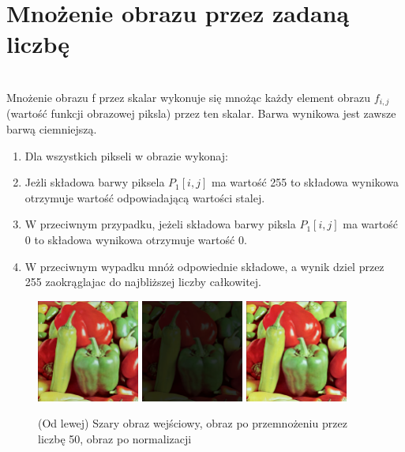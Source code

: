 \documentclass[final,a4paper,openany,12pt]{mwbk}
\begin{document}
\section {Mnożenie obrazu przez zadaną liczbę}
\hfill\\
\indent
Mnożenie obrazu f przez skalar wykonuje się mnożąc każdy element obrazu $f_{i,j}$ (wartość funkcji obrazowej piksla) przez ten skalar. Barwa wynikowa jest zawsze barwą ciemniejszą.

\begin{enumerate}
		\item Dla wszystkich pikseli w obrazie wykonaj:
		\item Jeżli składowa barwy piksela $P_{1}[i,j]$ ma wartość 255 to składowa wynikowa otrzymuje wartość odpowiadającą wartości stalej.
		\item W przeciwnym przypadku, jeżeli składowa barwy piksla $P_{1}[i,j]$ ma wartość 0 to składowa wynikowa otrzymuje wartość 0.
		\item W przeciwnym wypadku mnóż odpowiednie składowe, a wynik dziel przez 255 zaokrąglajac do najbliższej liczby całkowitej.
	\end{enumerate}

\begin{figure}[H]
	\begin{center}
		\includegraphics[width=0.3\textwidth]{1/1Color_Const_Multipl_Original}
		\includegraphics[width=0.3\textwidth]{1/1Color_Const_Multipl_Result}
		\includegraphics[width=0.3\textwidth]{1/1Color_Const_Multipl_Result_Norm}
	\end{center}
	\caption{(Od lewej) Szary obraz wejściowy, obraz po przemnożeniu przez liczbę 50, obraz po normalizacji }
\end{figure}
\end{document}
